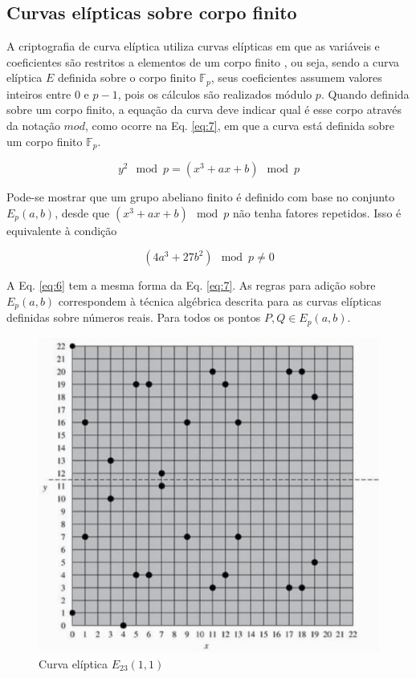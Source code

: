 %
%
\subsection{Curvas elípticas sobre corpo finito}
A criptografia de curva elíptica utiliza curvas elípticas em que as variáveis e coeficientes são restritos a elementos de um corpo finito \cite{Stallings:2011}, ou seja, sendo a curva elíptica $E$ definida sobre o corpo finito $\mathbb{F}_p$, seus coeficientes assumem valores inteiros entre 0 e $p - 1$, pois os cálculos são realizados módulo \(p\). Quando definida sobre um corpo finito, a equação da curva deve indicar qual é esse corpo através da notação $mod$, como ocorre na Eq. \ref{eq:7}, em que a curva está definida sobre um corpo finito $\mathbb{F}_p$.

\begin{equation}
y^2 \mod p = (x^3 + ax + b) \mod p \label{eq:7}
\end{equation}

Pode-se mostrar que um grupo abeliano finito é definido com base no conjunto $E_p(a, b)$, desde que $(x^3 + ax + b) \mod p$ não tenha fatores repetidos. Isso é equivalente à condição

\begin{equation}
(4a^3 + 27b^2) \mod p \neq 0
\end{equation}

A Eq. \ref{eq:6} tem a mesma forma da Eq. \ref{eq:7}. As regras para adição sobre $E_p(a, b)$ correspondem à técnica algébrica descrita para as curvas elípticas definidas sobre números reais. Para todos os pontos $P, Q \in E_p(a, b)$.

\begin{figure}[h]
\centering
\includegraphics[scale=0.6, bb=0 0 515 478]{figuras/curva_sobre_corpo_finito.eps}
\caption{Curva elíptica $E_{23}(1, 1)$}
\label{fig:curva_exemplo}
\end{figure}

